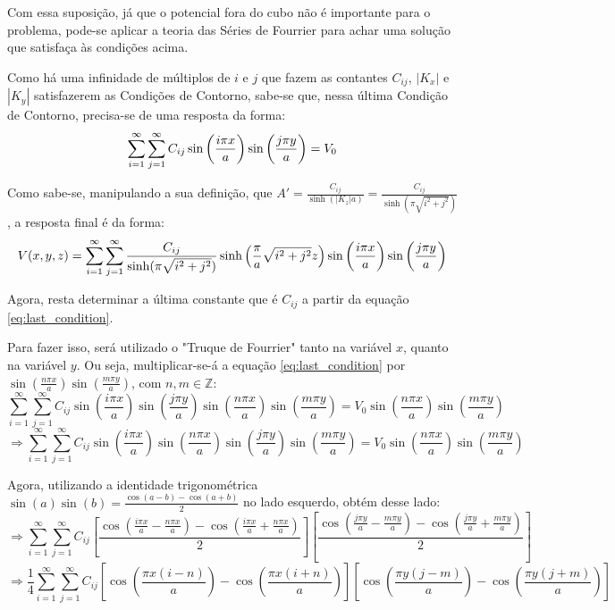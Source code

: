\documentclass{report}
\begin{document}
Com essa suposição, já que o potencial fora do cubo não é importante para o problema, pode-se
aplicar a teoria das Séries de Fourrier para achar uma solução que satisfaça às condições acima.

Como há uma infinidade de múltiplos de $ i $ e $ j $ que fazem as contantes $ C_{ij} $, $ |K_x| $ e $ |K_y| $ satisfazerem as
Condições de Contorno, sabe-se que, nessa última Condição de Contorno, precisa-se de uma resposta da forma:
\begin{equation}
  \label{eq:last_condition}
  \centering
  \sum_{i=1}^{\infty} \sum_{j=1}^{\infty} C_{ij}\sin\left(\frac{i\pi x}{a}\right)\sin\left(\frac{j\pi y}{a}\right) = V_0
\end{equation}

Como sabe-se, manipulando a sua definição, que $ A' = \frac{C_{ij}}{\sinh(|K_z|a)} = \frac{C_{ij}}{\sinh(\pi\sqrt{i^2 + j^2})} $, a resposta final é da forma:
\begin{equation}
  \label{eq:problem_part2_solution}
  \centering
  V(x, y, z) = \sum_{i=1}^{\infty} \sum_{j=1}^{\infty} \frac{C_{ij}}{\sinh(\pi\sqrt{i^2 + j^2})}\sinh\left(\frac{\pi}{a}\sqrt{i^2 + j^2}z\right)\sin\left(\frac{i\pi x}{a}\right)\sin\left(\frac{j\pi y}{a}\right)
\end{equation}

Agora, resta determinar a última constante que é $ C_{ij} $ a partir da equação \ref{eq:last_condition}.

Para fazer isso, será utilizado o "Truque de Fourrier" tanto na variável $ x $, quanto na variável $ y $. Ou seja, multiplicar-se-á a equação
\ref{eq:last_condition} por $ \sin\left(\frac{n\pi x}{a}\right)\sin\left(\frac{m\pi y}{a}\right) $, com $ n, m \in \mathbb{Z} $:
$$ \sum_{i=1}^{\infty} \sum_{j=1}^{\infty} C_{ij}\sin\left(\frac{i\pi x}{a}\right)\sin\left(\frac{j\pi y}{a}\right)\sin\left(\frac{n\pi x}{a}\right)\sin\left(\frac{m\pi y}{a}\right) = V_0\sin\left(\frac{n\pi x}{a}\right)\sin\left(\frac{m\pi y}{a}\right) $$
$$ \Rightarrow \sum_{i=1}^{\infty} \sum_{j=1}^{\infty} C_{ij}\sin\left(\frac{i\pi x}{a}\right)\sin\left(\frac{n\pi x}{a}\right)\sin\left(\frac{j\pi y}{a}\right)\sin\left(\frac{m\pi y}{a}\right) = V_0\sin\left(\frac{n\pi x}{a}\right)\sin\left(\frac{m\pi y}{a}\right) $$

Agora, utilizando a identidade trigonométrica $ \sin(a)\sin(b) = \frac{\cos(a - b) - \cos(a + b)}{2} $ no lado esquerdo, obtém desse lado:
$$ \Rightarrow \sum_{i=1}^{\infty} \sum_{j=1}^{\infty} C_{ij}\left[\frac{\cos\left(\frac{i\pi x}{a} - \frac{n\pi x}{a}\right) - \cos\left(\frac{i\pi x}{a} + \frac{n\pi x}{a}\right)}{2}\right]\left[\frac{\cos\left(\frac{j\pi y}{a} - \frac{m\pi y}{a}\right) - \cos\left(\frac{j\pi y}{a} + \frac{m\pi y}{a}\right)}{2}\right]$$
$$ \Rightarrow \frac{1}{4}\sum_{i=1}^{\infty} \sum_{j=1}^{\infty} C_{ij}\left[\cos\left(\frac{\pi x(i - n)}{a}\right) - \cos\left(\frac{\pi x(i + n)}{a}\right)\right]\left[\cos\left(\frac{\pi y(j - m)}{a}\right) - \cos\left(\frac{\pi y(j + m)}{a}\right)\right]$$
\end{document}
